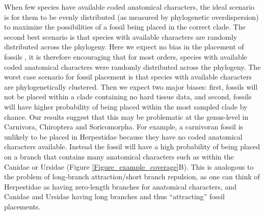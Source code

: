 \documentclass[12pt,letterpaper]{article}
\begin{document}
%
%
%

When few species have available coded anatomical characters, the ideal scenario is for them to be evenly distributed (as measured by phylogenetic overdispersion) to maximize the possibilities of a fossil being placed in the correct clade.
The second best scenario is that species with available characters are randomly distributed across the phylogeny. 
Here we expect no bias in the placement of fossils \cite{GuillermeCooper}, it is therefore encouraging that for most orders, species with available coded anatomical characters were randomly distributed across the phylogeny.
The worst case scenario for fossil placement is that species with available characters are phylogenetically clustered. 
Then we expect two major biases: first, fossils will not be placed within a clade containing no hard tissue data, and second, fossils will have higher probability of being placed within the most sampled clade by chance. %
Our results suggest that this may be problematic at the genus-level in Carnivora, Chiroptera and Soricomorpha. 
For example, a carnivoran fossil is unlikely to be placed in Herpestidae because they have no coded anatomical characters available.
Instead the fossil will have a high probability of being placed on a branch that contains many anatomical characters such as within the Canidae or Ursidae (Figure \ref{Figure_example_coverage}B). 
This is analogous to the problem of long-branch attraction/short branch repulsion, as one can think of Herpestidae as having zero-length branches for anatomical characters, and Canidae and Ursidae having long branches and thus ``attracting'' fossil placements. %
\end{document}
